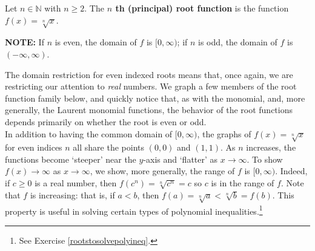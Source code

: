 \colorbox{ResultColor}{\bbm

\begin{defn} \label{principalrootfunction}  Let $n \in \mathbb{N}$ with $n \geq 2$.  The  \textbf{$n$ th (principal) root function} is the function $f(x) = \sqrt[n]{x}$.  

\textbf{NOTE:}  If $n$ is even, the domain of $f$ is $[0, \infty)$;  if $n$ is odd, the domain of $f$ is $(-\infty, \infty)$.

\end{defn}

\ebm}

\smallskip

The domain restriction for even indexed roots means that, once again, we are restricting our attention to \textit{real} numbers.  We graph a few members of the root function family below, and quickly notice that, as with the monomial, and, more generally, the Laurent monomial functions, the behavior of the root functions depends primarily on whether the root is even or odd.  \\


In addition to having the common domain of $[0, \infty)$, the graphs of $f(x) = \sqrt[n]{x}$ for even indices $n$ all share the points $(0,0)$ and $(1,1)$. As $n$ increases, the functions become `steeper' near the $y$-axis and `flatter' as $x \rightarrow \infty$.  To show $f(x) \rightarrow \infty$ as $x \rightarrow \infty$, we show, more generally, the range of $f$ is $[0, \infty)$.  Indeed, if $c \geq 0$ is a real number, then $f(c^n) = \sqrt[n]{c^n} = c$ so $c$ is in the range of $f$.  Note that $f$ is increasing:  that is, if $a<b$, then $f(a) = \sqrt[n]{a} < \sqrt[n]{b} = f(b)$. This property is useful in solving certain types of polynomial inequalities.\footnote{See Exercise \ref{rootstosolvepolyineq}.}

